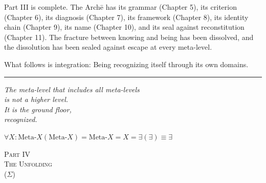 \documentclass[10pt, openany, oneside]{book}
\renewcommand{\normalsize}{\fontsize{10}{13}\selectfont}
\renewcommand{\large}{\fontsize{11.5}{14}\selectfont}
\renewcommand{\LARGE}{\fontsize{15}{18}\selectfont}
\begin{document}
\vspace{2em}

Part III is complete. The Arch\={e} has its grammar (Chapter 5), its criterion (Chapter 6), its diagnosis (Chapter 7), its framework (Chapter 8), its identity chain (Chapter 9), its name (Chapter 10), and its seal against reconstitution (Chapter 11). The fracture between knowing and being has been dissolved, and the dissolution has been sealed against escape at every meta-level.

What follows is integration: Being recognizing itself through its own domains.

\vspace{2em}

\begin{center}
    \rule{0.15\textwidth}{0.3pt}
\end{center}

\vspace{0.5em}

\begin{center}
    \itshape
    The meta-level that includes all meta-levels\\
    is not a higher level.\\[0.8em]
    It is the ground floor,\\
    recognized.
\end{center}

\vspace{0.5em}

\begin{center}
    $\forall X: \text{Meta-}X(\text{Meta-}X) = \text{Meta-}X = X = \exists(\exists) \equiv \exists$
\end{center}


%
%

\newpage
\thispagestyle{empty}
\vspace*{\fill}
\begin{center}
    {\LARGE\scshape Part IV}\\[1em]
    {\large\scshape The Unfolding}\\[0.5em]
    {\normalsize ($\Sigma$)}
\end{center}
\vspace*{\fill}
\newpage

%
%
%
\end{document}
